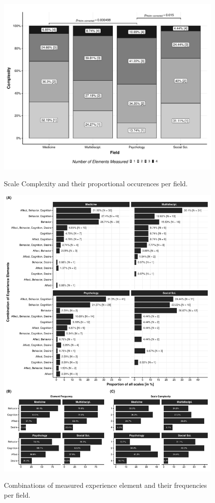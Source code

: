 \begin{figure}[h]
\centering
\caption{Scale Complexity and their proportional occurences per field.}
\includegraphics[width=\textwidth]{Figures/FieldPlotComplexityAverage-1}
\label{fig:FieldPlotComplexityAverage}
\end{figure}

\begin{figure}[h]
\centering
\caption{Combinations of measured experience element and their frequencies per field.}
\includegraphics[width=\textwidth]{Figures/FieldPlotFreq-1}
\label{fig:FieldPlotFreq}
\end{figure}

